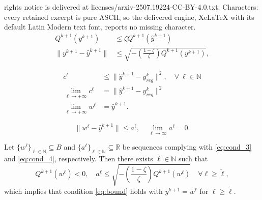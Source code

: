 \documentclass[10pt,a4paper]{amsart}
\def\N{\mathbb{N}}
\def\R{\mathbb{R}}
\newcommand{\yck}{{y_{reg}^k}}
\begin{document}
rights notice is delivered at licenses/arxiv-2507.19224-CC-BY-4.0.txt. Characters: every retained excerpt is pure ASCII, so the delivered engine, XeLaTeX with its default Latin Modern text font, reports no missing character.
\begin{align}
    Q^{k+1}(y^{k+1})&\leq \zeta 
    Q^{k+1}(\hat{y}^{k+1})\label{eq:inexact}\\
    \|y^{k+1}-\hat{y}^{k+1}\|&\leq \sqrt{-\left(\frac{1-\zeta}{\zeta}\right)Q^{k+1}(y^{k+1})},\label{eq:bound}
\end{align}

    \begin{align}
        c^\ell &\le \|\hat{y}^{k+1}-\yck\|^2, \quad \forall \ \ell \in \mathbb{N} \label{eq:cond_1} \\
        \lim_{\ell \rightarrow +\infty} c^\ell & = \|\hat{y}^{k+1}-\yck\|^2 \label{eq:cond_2} \\
        \lim_{\ell \rightarrow +\infty} w^\ell & = \hat{y}^{k+1}. \label{eq:cond_3}
    \end{align}

\begin{equation}\label{eq:cond_4}
    \|w^{\ell}-\hat{y}^{k+1}\|\leq a^{\ell}, \quad \lim_{\ell\rightarrow \infty}a^{\ell} = 0.  
\end{equation}

\begin{lemma}\label{lem:stopping_2}
    Let $\{w^{\ell}\}_{\ell\in\N}\subseteq B$ and $\{a^{\ell}\}_{\ell\in\N}\subseteq \R$ be sequences complying with \eqref{eq:cond_3} and \eqref{eq:cond_4}, respectively.
    Then there exists $\tilde{\ell}\in\N$ such that
    \begin{equation}\label{eq:stopping_2}
        Q^{k+1}(w^{{\ell}})< 0, \quad a^{{\ell}}\leq \sqrt{-\left(\frac{1-\zeta}{\zeta}\right)Q^{k+1}(w^{{\ell}})} \quad \forall \ell\ge \tilde \ell,
    \end{equation}
    which implies that condition \eqref{eq:bound} holds with $y^{k+1} = w^{\ell}$ for $\ell\ge \tilde \ell$.
\end{lemma}
\end{document}
